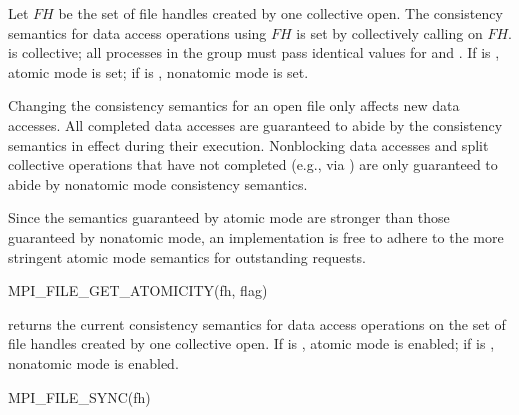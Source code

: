 Let $FH$ be the set of file handles created by one collective open.
The consistency semantics for data access operations using $FH$
is set by collectively calling  on $FH$.
 is collective;
all processes in the group must pass identical values for
 and .
If  is , atomic mode is set;
if  is , nonatomic mode is set.

Changing the consistency semantics for an open file only affects new
data accesses.  All completed data accesses are guaranteed to abide
by the consistency semantics in effect during their execution.
Nonblocking data accesses
and split collective operations
that
have not completed
(e.g., via ) are only guaranteed
to abide by nonatomic mode consistency semantics.

\begin{implementors}
Since the semantics guaranteed by atomic mode are stronger than
those guaranteed by nonatomic mode, an implementation is
free to adhere to the more stringent atomic mode semantics
for outstanding requests.
\end{implementors}

%
\begin{funcdef}{MPI\_FILE\_GET\_ATOMICITY}{(\mbox{fh}, \mbox{flag})}
\end{funcdef}

 returns
the current consistency semantics for
data access operations on
the set of file handles created by one collective open.
If  is , atomic mode is enabled;
if  is , nonatomic mode is enabled.

%
\begin{funcdef}{MPI\_FILE\_SYNC}{(\mbox{fh})}
\end{funcdef}

